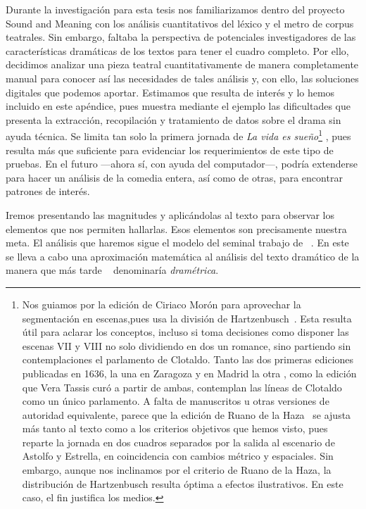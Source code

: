 Durante la investigación para esta tesis nos familiarizamos dentro del proyecto Sound and Meaning con los análisis cuantitativos del léxico y el metro de corpus teatrales. Sin embargo, faltaba la perspectiva de potenciales investigadores de las características dramáticas de los textos para tener el cuadro completo. Por ello, decidimos analizar una pieza teatral cuantitativamente de manera completamente manual para conocer así las necesidades de tales análisis y, con ello, las soluciones digitales que podemos aportar. Estimamos que resulta de interés y lo hemos incluido en este apéndice, pues muestra mediante el ejemplo las dificultades que presenta la extracción, recopilación y tratamiento de datos sobre el drama sin ayuda técnica. Se limita tan solo la primera jornada de \textit{La vida es sueño}\footnote{Nos guiamos por la edición de Ciriaco Morón para aprovechar la segmentación en escenas,pues usa la división de Hartzenbusch~\parencite{calderon_hartzenbusch}. Esta resulta útil para aclarar los conceptos, incluso si toma decisiones como disponer las escenas VII y VIII no solo dividiendo en dos un romance, sino partiendo sin contemplaciones el parlamento de Clotaldo. Tanto las dos primeras ediciones publicadas en 1636, la una en Zaragoza \parencite{calderon_zaragoza} y en Madrid la otra \parencite{calderon_madrid}, como la edición que Vera Tassis \parencite{calderon_vt} curó a partir de ambas, contemplan las líneas de Clotaldo como un único parlamento. A falta de manuscritos u otras versiones de autoridad equivalente, parece que la edición de Ruano de la Haza~\parencite{calderon_ruano} se ajusta más tanto al texto como a los criterios objetivos que hemos visto, pues reparte la jornada en dos cuadros separados por la salida al escenario de Astolfo y Estrella, en coincidencia con cambios métrico y espaciales. Sin embargo, aunque nos inclinamos por el criterio de Ruano de la Haza, la distribución de Hartzenbusch resulta óptima a efectos ilustrativos. En este caso, el fin justifica los medios.} \parencite{calderon_lavidaessuenno}, pues resulta más que suficiente para evidenciar los requerimientos de este tipo de pruebas. En el futuro —ahora sí, con ayuda del computador—, podría extenderse para hacer un análisis de la comedia entera, así como de otras, para encontrar patrones de interés.
		
Iremos presentando las magnitudes y aplicándolas al texto para observar los elementos que nos permiten hallarlas. Esos elementos son precisamente nuestra meta. El análisis que haremos sigue el modelo del seminal trabajo de \citeauthor{dinu1968}~\parencite*{dinu1968}. En este se lleva a cabo una aproximación matemática al análisis del texto dramático de la manera que más tarde \citeauthor{romanska2015}~\parencite*[446]{romanska2015} denominaría \textit{dramétrica}.

